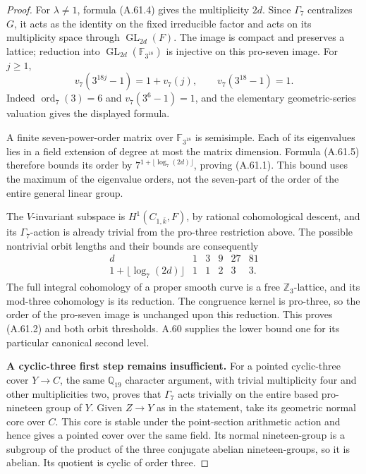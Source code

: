 \begin{proof}
For $\lambda\ne1$, formula (A.61.4) gives the
multiplicity $2d$.  Since $\Gamma_7$ centralizes
$G$, it acts as the identity on the fixed
irreducible factor and acts on its multiplicity
space through $\operatorname{GL}_{2d}(F)$.
The image is compact and preserves a lattice;
reduction into $\operatorname{GL}_{2d}
(\mathbb F_{3^{18}})$ is injective on this
pro-seven image.  For $j\ge1$,
\[
 v_7(3^{18j}-1)=1+v_7(j),
 \qquad v_7(3^{18}-1)=1.                                \tag{A.61.5}
\]
Indeed $\operatorname{ord}_7(3)=6$ and
$v_7(3^6-1)=1$, and the elementary geometric-series
valuation gives the displayed formula.

A finite seven-power-order matrix over
$\mathbb F_{3^{18}}$ is semisimple.  Each of its
eigenvalues lies in a field extension of degree
at most the matrix dimension.  Formula (A.61.5)
therefore bounds its order by
$7^{1+\lfloor\log_7(2d)\rfloor}$, proving
(A.61.1).  This bound uses the maximum of the
eigenvalue orders, not the seven-part of the
order of the entire general linear group.

The $V$-invariant subspace is
$H^1(C_{1,\bar k},F)$, by rational cohomological
descent, and its $\Gamma_7$-action is already
trivial from the pro-three restriction above.
The possible nontrivial orbit lengths and their
bounds are consequently
\[
\begin{array}{c|ccccc}
 d&1&3&9&27&81\\\hline
 1+\lfloor\log_7(2d)\rfloor&1&1&2&3&3.
\end{array}                                               \tag{A.61.6}
\]
The full integral cohomology of a proper smooth
curve is a free $\mathbb Z_3$-lattice, and its
mod-three cohomology is its reduction.  The
congruence kernel is pro-three, so the order of
the pro-seven image is unchanged upon this
reduction.  This proves (A.61.2) and both orbit
thresholds.  A.60 supplies the lower bound one
for its particular canonical second level.

\medskip\noindent\textbf{A cyclic-three first step remains insufficient.}
For a pointed cyclic-three cover $Y\to C$, the
same $\mathbb Q_{19}$ character argument, with
trivial multiplicity four and other multiplicities
two, proves that $\Gamma_7$ acts trivially on
the entire based pro-nineteen group of $Y$.
Given $Z\to Y$ as in the statement, take its
geometric normal core over $C$.  This core is
stable under the point-section arithmetic action
and hence gives a pointed cover over the same
field.  Its normal nineteen-group is a subgroup
of the product of the three conjugate abelian
nineteen-groups, so it is abelian.  Its quotient
is cyclic of order three.


\end{proof}
